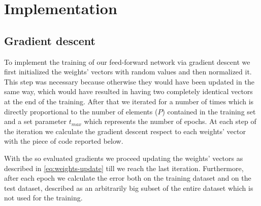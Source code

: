 \section{Implementation}
\label{sec:implementation}

\subsection{Gradient descent}
To implement the training of our feed-forward network via gradient descent we first initialized the weights' vectors with random values and then
normalized it. This step was necessary because otherwise they would have been updated in the same way, which would have resulted
in having two completely identical vectors at the end of the training.
After that we iterated for a number of times which is directly proportional to the number of elements ($P$) contained in the training set and a set parameter
$t_{max}$ which represents the number of epochs. At each step of the iteration we calculate the gradient descent respect to each weights' vector
with the piece of code reported below.

With the so evaluated gradients we proceed updating the weights' vectors as described in \cref{eq:weights-update} till we reach the last iteration.
Furthermore, after each epoch we calculate the error both on the training dataset and on the test dataset, described as an arbitrarily big subset
of the entire dataset which is not used for the training.